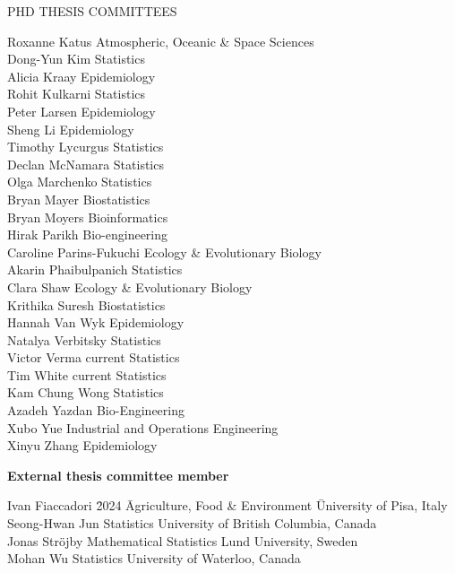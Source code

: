 \begin{mylist}{PHD THESIS COMMITTEES}
\begin{tabbing}
Roxanne Katus  \> Atmospheric, Oceanic \& Space Sciences\\
Dong-Yun Kim  \> Statistics\\
Alicia Kraay  \> Epidemiology\\
Rohit Kulkarni  \> Statistics\\
Peter Larsen  \> Epidemiology\\
Sheng Li  \>Epidemiology\\
Timothy Lycurgus  \> Statistics\\
Declan McNamara  \> Statistics\\
Olga Marchenko  \> Statistics\\
Bryan Mayer  \> Biostatistics\\
Bryan Moyers \> Bioinformatics\\
Hirak Parikh  \> Bio-engineering\\
Caroline Parins-Fukuchi  \> Ecology \& Evolutionary Biology\\
Akarin Phaibulpanich  \> Statistics\\
Clara Shaw \> Ecology \& Evolutionary Biology\\
Krithika Suresh  \> Biostatistics\\
Hannah Van Wyk  \> Epidemiology\\
Natalya Verbitsky  \> Statistics\\
Victor Verma \> current \> Statistics\\
Tim White \> current \> Statistics\\
Kam Chung Wong  \> Statistics\\
Azadeh Yazdan  \> Bio-Engineering\\
Xubo Yue  \> Industrial and Operations Engineering\\
Xinyu Zhang  \> Epidemiology \\
\end{tabbing}

\item {\bf External thesis committee member}
\begin{tabbing}
  Ivan Fiaccadori \hspace{3mm} \= 2024 \hspace{3mm} \= Agriculture, Food \& Environment \hspace{1mm} \= University of Pisa, Italy\\
  Seong-Hwan Jun  \> Statistics \> University of British Columbia, Canada\\
Jonas Str\"{o}jby  \> Mathematical Statistics \> Lund University, Sweden\\
Mohan Wu  \> Statistics \> University of Waterloo, Canada\\
\end{tabbing}

\end{mylist}


